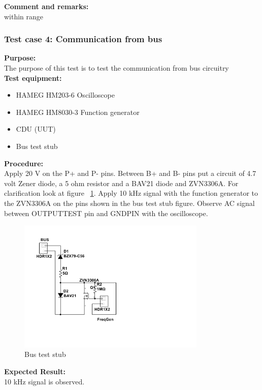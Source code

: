 \textbf{Comment and remarks:}\\
within range\\

\subsubsection{Test case 4: Communication from bus}
\textbf{Purpose:}\\
The purpose of this test is to test the communication from bus circuitry\\

\textbf{Test equipment:}
\begin{itemize}
\item HAMEG HM203-6 Oscilloscope
\item HAMEG HM8030-3 Function generator
\item CDU (UUT)
\item Bus test stub
\end{itemize}

\textbf{Procedure:}\\
Apply 20 V on the P+ and P- pins. Between B+ and B- pins put a circuit of 4.7 volt Zener diode, a 5 ohm resistor and a BAV21 diode and ZVN3306A. For clarification look at figure ~\ref{fig:busteststub}. Apply 10 kHz signal with the function generator to the ZVN3306A on the pins shown in the bus test stub figure. Observe AC signal between OUTPUTTEST pin and GNDPIN with the oscilloscope.\\
\begin{figure}[H]
\centering
\includegraphics[width=0.8\textwidth]{billeder/BusTestStub}
\caption{Bus test stub}
\label{fig:busteststub}
\end{figure} 


\textbf{Expected Result:}\\
10 kHz signal is observed.\\

